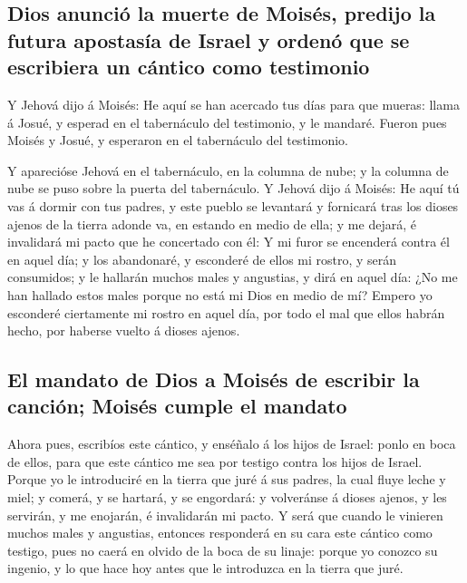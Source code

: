 \hypertarget{dios-anunciuxf3-la-muerte-de-moisuxe9s-predijo-la-futura-apostasuxeda-de-israel-y-ordenuxf3-que-se-escribiera-un-cuxe1ntico-como-testimonio}{%
\subsection{Dios anunció la muerte de Moisés, predijo la futura
apostasía de Israel y ordenó que se escribiera un cántico como
testimonio}\label{dios-anunciuxf3-la-muerte-de-moisuxe9s-predijo-la-futura-apostasuxeda-de-israel-y-ordenuxf3-que-se-escribiera-un-cuxe1ntico-como-testimonio}}

 Y Jehová dijo á Moisés: He aquí se han acercado tus días
para que mueras: llama á Josué, y esperad en el tabernáculo del
testimonio, y le mandaré. Fueron pues Moisés y Josué, y esperaron en el
tabernáculo del testimonio.

 Y aparecióse Jehová en el tabernáculo, en la columna de
nube; y la columna de nube se puso sobre la puerta del tabernáculo.
 Y Jehová dijo á Moisés: He aquí tú vas á dormir con tus
padres, y este pueblo se levantará y fornicará tras los dioses ajenos de
la tierra adonde va, en estando en medio de ella; y me dejará, é
invalidará mi pacto que he concertado con él:  Y mi furor
se encenderá contra él en aquel día; y los abandonaré, y esconderé de
ellos mi rostro, y serán consumidos; y le hallarán muchos males y
angustias, y dirá en aquel día: ¿No me han hallado estos males porque no
está mi Dios en medio de mí?  Empero yo esconderé
ciertamente mi rostro en aquel día, por todo el mal que ellos habrán
hecho, por haberse vuelto á dioses ajenos.

\hypertarget{el-mandato-de-dios-a-moisuxe9s-de-escribir-la-canciuxf3n-moisuxe9s-cumple-el-mandato}{%
\subsection{El mandato de Dios a Moisés de escribir la canción; Moisés
cumple el
mandato}\label{el-mandato-de-dios-a-moisuxe9s-de-escribir-la-canciuxf3n-moisuxe9s-cumple-el-mandato}}

 Ahora pues, escribíos este cántico, y enséñalo á los
hijos de Israel: ponlo en boca de ellos, para que este cántico me sea
por testigo contra los hijos de Israel.  Porque yo le
introduciré en la tierra que juré á sus padres, la cual fluye leche y
miel; y comerá, y se hartará, y se engordará: y volveránse á dioses
ajenos, y les servirán, y me enojarán, é invalidarán mi pacto.
 Y será que cuando le vinieren muchos males y angustias,
entonces responderá en su cara este cántico como testigo, pues no caerá
en olvido de la boca de su linaje: porque yo conozco su ingenio, y lo
que hace hoy antes que le introduzca en la tierra que juré.


